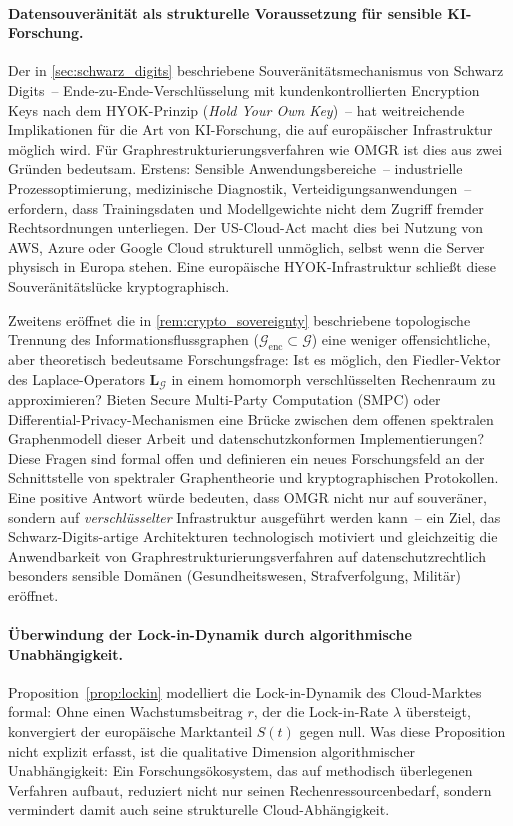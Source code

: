 \documentclass[12pt, a4paper, openany]{report}
\newcommand{\calG}{\mathcal{G}}
\begin{document}
\paragraph{Datensouveränität als strukturelle Voraussetzung für
  sensible KI-Forschung.}
Der in \cref{sec:schwarz_digits} beschriebene Souveränitätsmechanismus
von Schwarz Digits~-- Ende-zu-Ende-Verschlüsselung mit
kundenkontrollierten Encryption Keys nach dem HYOK-Prinzip
(\textit{Hold Your Own Key})~-- hat weitreichende Implikationen für die
Art von KI-Forschung, die auf europäischer Infrastruktur möglich wird.
Für Graphrestrukturierungsverfahren wie OMGR ist dies aus zwei Gründen
bedeutsam.  Erstens: Sensible Anwendungsbereiche~-- industrielle
Prozessoptimierung, medizinische Diagnostik,
Verteidigungsanwendungen~-- erfordern, dass Trainingsdaten und
Modellgewichte nicht dem Zugriff fremder Rechtsordnungen unterliegen.
Der US-Cloud-Act macht dies bei Nutzung von AWS, Azure oder Google
Cloud strukturell unmöglich, selbst wenn die Server physisch in Europa
stehen.  Eine europäische HYOK-Infrastruktur schließt diese
Souveränitätslücke kryptographisch.

Zweitens eröffnet die in \cref{rem:crypto_sovereignty} beschriebene
topologische Trennung des Informationsflussgraphen
($\calG_{\mathrm{enc}} \subset \calG$) eine weniger offensichtliche,
aber theoretisch bedeutsame Forschungsfrage: Ist es möglich, den
Fiedler-Vektor des Laplace-Operators $\bm{L}_{\calG}$ in einem
homomorph verschlüsselten Rechenraum zu approximieren?  Bieten Secure
Multi-Party Computation (SMPC) oder Differential-Privacy-Mechanismen
eine Brücke zwischen dem offenen spektralen Graphenmodell dieser Arbeit
und datenschutzkonformen Implementierungen?  Diese Fragen sind formal
offen und definieren ein neues Forschungsfeld an der Schnittstelle von
spektraler Graphentheorie und kryptographischen Protokollen.  Eine
positive Antwort würde bedeuten, dass OMGR nicht nur auf souveräner,
sondern auf \emph{verschlüsselter} Infrastruktur ausgeführt werden
kann~-- ein Ziel, das Schwarz-Digits-artige Architekturen technologisch
motiviert und gleichzeitig die Anwendbarkeit von
Graphrestrukturierungsverfahren auf datenschutzrechtlich besonders
sensible Domänen (Gesundheitswesen, Strafverfolgung, Militär) eröffnet.

\paragraph{Überwindung der Lock-in-Dynamik durch algorithmische
  Unabhängigkeit.}
Proposition~\ref{prop:lockin} modelliert die Lock-in-Dynamik des
Cloud-Marktes formal: Ohne einen Wachstumsbeitrag $r$, der die
Lock-in-Rate $\lambda$ übersteigt, konvergiert der europäische
Marktanteil $S(t)$ gegen null.  Was diese Proposition nicht explizit
erfasst, ist die qualitative Dimension algorithmischer Unabhängigkeit:
Ein Forschungsökosystem, das auf methodisch überlegenen Verfahren
aufbaut, reduziert nicht nur seinen Rechenressourcenbedarf, sondern
vermindert damit auch seine strukturelle Cloud-Abhängigkeit.
\end{document}
